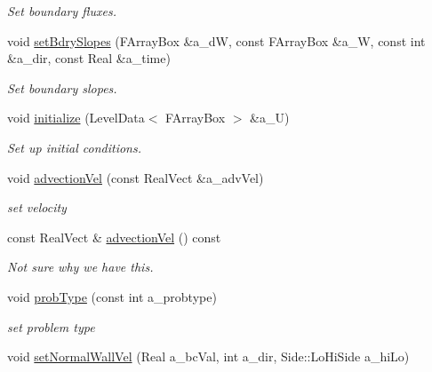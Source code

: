 \begin{DoxyCompactItemize}
\begin{DoxyCompactList}\small\item\em Set boundary fluxes. \end{DoxyCompactList}\item 
void \hyperlink{class_vel_i_b_c_a39ac3b18e885c749a1081ba7042941df}{set\-Bdry\-Slopes} (F\-Array\-Box \&a\-\_\-d\-W, const F\-Array\-Box \&a\-\_\-\-W, const int \&a\-\_\-dir, const Real \&a\-\_\-time)
\begin{DoxyCompactList}\small\item\em Set boundary slopes. \end{DoxyCompactList}\item 
void \hyperlink{class_vel_i_b_c_a0f2d126d3a569f828e0370c0c7dc6ec9}{initialize} (Level\-Data$<$ F\-Array\-Box $>$ \&a\-\_\-\-U)
\begin{DoxyCompactList}\small\item\em Set up initial conditions. \end{DoxyCompactList}\item 
\hypertarget{class_vel_i_b_c_a6b43f398d36e8aeb1ca17d11003b57f4}{void \hyperlink{class_vel_i_b_c_a6b43f398d36e8aeb1ca17d11003b57f4}{advection\-Vel} (const Real\-Vect \&a\-\_\-adv\-Vel)}\label{class_vel_i_b_c_a6b43f398d36e8aeb1ca17d11003b57f4}

\begin{DoxyCompactList}\small\item\em set velocity \end{DoxyCompactList}\item 
\hypertarget{class_vel_i_b_c_aa6ee7928a2f0d92c6420c4ac0e29b0e6}{const Real\-Vect \& \hyperlink{class_vel_i_b_c_aa6ee7928a2f0d92c6420c4ac0e29b0e6}{advection\-Vel} () const }\label{class_vel_i_b_c_aa6ee7928a2f0d92c6420c4ac0e29b0e6}

\begin{DoxyCompactList}\small\item\em Not sure why we have this. \end{DoxyCompactList}\item 
\hypertarget{class_vel_i_b_c_acbb613201240705e212ba21f906ba08e}{void \hyperlink{class_vel_i_b_c_acbb613201240705e212ba21f906ba08e}{prob\-Type} (const int a\-\_\-probtype)}\label{class_vel_i_b_c_acbb613201240705e212ba21f906ba08e}

\begin{DoxyCompactList}\small\item\em set problem type \end{DoxyCompactList}\item 
\hypertarget{class_vel_i_b_c_a5f45d506e02001c6c9b2034c973dc44e}{void \hyperlink{class_vel_i_b_c_a5f45d506e02001c6c9b2034c973dc44e}{set\-Normal\-Wall\-Vel} (Real a\-\_\-bc\-Val, int a\-\_\-dir, Side\-::\-Lo\-Hi\-Side a\-\_\-hi\-Lo)}\label{class_vel_i_b_c_a5f45d506e02001c6c9b2034c973dc44e}


\end{DoxyCompactItemize}
